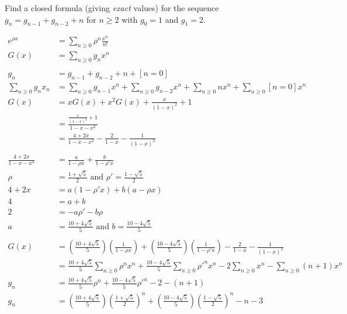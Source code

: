 Find a closed formula (giving \textit{exact} values) for the sequence $g_n = g_{n-1} + g_{n-2} + n$ for $n\ge2$ with $g_0=1$ and $g_1=2$.
\begin{framed}
	\begin{align*}
	e^{\rho x} &= \sum_{n\ge0}{\rho}^n\frac{x^n}{n!}\\
		G(x) &= \sum_{n\ge0}g_nx^n\\
		\\
		g_n &= g_{n-1} + g_{n-2} + n + [n=0]\\
		\sum_{n\ge0}g_nx_n&= \sum_{n\ge0}g_{n-1}x^n +  \sum_{n\ge0}g_{n-2}x^n + \sum_{n\ge0}nx^n + \sum_{n\ge0}[n=0]x^n\\
		G(x) &= xG(x) + x^2G(x) + \frac{x}{(1-x)^2} + 1\\
		&=  \frac{\frac{x}{(1-x)^2} + 1}{1-x-x^2}\\
		&= \frac{4+2x}{1-x-x^2} - \frac{2}{1-x} - \frac{1}{(1-x)^2}\\
		\\
		\frac{4+2x}{1-x-x^2} &= \frac{a}{1-\rho x} + \frac{b}{1-\rho' x}\\
		\rho &= \frac{1+\sqrt5}{2} \text{ and } \rho' = \frac{1-\sqrt5}{2}\\
		4+2x &= a(1-\rho' x) + b(a-\rho x)\\
		4 &= a + b\\
		2 &= -a\rho' - b\rho \\
			a &= \frac{10+ 4\sqrt5}{5} \text{ and } b = \frac{10 - 4\sqrt5}{5}\\
		\\
		G(x) &= (\frac{10+ 4\sqrt5}{5})(\frac{1}{1-\rho x}) + (\frac{10 - 4\sqrt5}{5})(\frac{1}{1-\rho' x}) - \frac{2}{1-x} - \frac{1}{(1-x)^2}\\
		&= \frac{10+ 4\sqrt5}{5}\sum_{n\ge0}\rho^nx^n + \frac{10 - 4\sqrt5}{5}\sum_{n\ge0}\rho'^nx^n - 2\sum_{n\ge0}x^n - \sum_{n\ge0}(n+1)x^n\\
		g_n &= \frac{10+ 4\sqrt5}{5}\rho^n +  \frac{10 - 4\sqrt5}{5}\rho'^n -2-(n+1)\\
		g_n &= (\frac{10+ 4\sqrt5}{5})(\frac{1+\sqrt5}{2})^n +  (\frac{10 - 4\sqrt5}{5})(\frac{1-\sqrt5}{2})^n -n-3\\
\\
\end{align*}

\end{framed}
